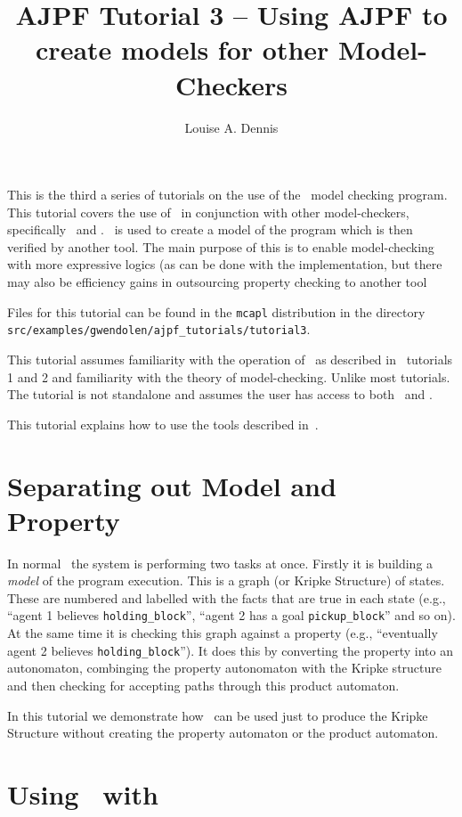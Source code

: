 \documentclass[a4]{article}
\author{Louise A. Dennis}
\title{AJPF Tutorial 3 -- Using AJPF to create models for other Model-Checkers}
\begin{document}
\maketitle
This is the third a series of tutorials on the use of the \ajpf\ model checking program.  This tutorial covers the use of \ajpf\ in conjunction with other model-checkers, specifically \spin\ and \prism.  \ajpf\ is used to create a model of the program which is then verified by another tool.  The main purpose of this is to enable model-checking with more expressive logics (as can be done with the \prism\) implementation, but there may also be efficiency gains in outsourcing property checking to another tool

Files for this tutorial can be found in the \texttt{mcapl} distribution in the directory \texttt{src/examples/gwendolen/ajpf\_tutorials/tutorial3}.

This tutorial assumes familiarity with the operation of \ajpf\ as described in \ajpf\ tutorials 1 and 2 and familiarity with the theory of model-checking.  Unlike most tutorials.  The tutorial is not standalone and assumes the user has access to both \spin\ and \prism.

This tutorial explains how to use the tools described in~\cite{dennis15:two}.

\section{Separating out Model and Property}

In normal \ajpf\ the system is performing two tasks at once.  Firstly it is building a \emph{model} of the program execution.  This is a graph (or Kripke Structure) of states.  These are numbered and labelled with the facts that are true in each state (e.g., ``agent 1 believes \texttt{holding\_block}'', ``agent 2 has a goal \texttt{pickup\_block}'' and so on).  At the same time it is checking this graph against a property (e.g., ``eventually agent 2 believes \texttt{holding\_block}'').  It does this by converting the property into an autonomaton, combinging the property autonomaton with the Kripke structure and then checking for accepting paths through this product automaton.

In this tutorial we demonstrate how \ajpf\ can be used just to produce the Kripke Structure without creating the property automaton or the product automaton.

\section{Using \ajpf\ with \spin}
\end{document}
